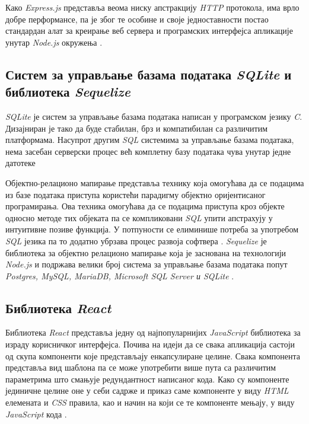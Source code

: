 \documentclass[12pt,oneside]{memoir}
\begin{document}
Како \textit{Express.js} представља веома ниску апстракцију \textit{HTTP} протокола, има врло добре перформансе, па је због те особине и своје једноставности постао стандардан алат за креирање веб сервера и програмских интерфејса апликације унутар \textit{Node.js }окружења \cite{mdnexpress}.

\subsection{Систем за управљање базама података \textit{SQLite} и библиотека \textit{Sequelize}}

\textit{SQLite} је систем за управљање базама података написан у програмском језику \textit{C}. Дизајниран је тако да буде стабилан, брз и компатибилан са различитим платформама.  Насупрот другим \textit{SQL} системима за управљање базама података, нема засебан серверски процес већ комплетну базу података чува унутар једне датотеке \cite{sqlite,sqlitetutorial}

Објектно-релационо мапирање представља технику која омогућава да се подацима из базе података приступа користећи парадигму објектно оријентисаног програмирања. Ова техника омогућава да се подацима приступа кроз објекте односно методе тих објеката па се компликовани \textit{SQL} упити апстрахују у интуитивне позиве функција. У потпуности се елиминише потреба за употребом \textit{SQL} језика па то додатно убрзава процес развоја софтвера \cite{orm}. \textit{Sequelize} је библиотека за објектно релационо мапирање која је заснована на технологији \textit{ Node.js} и подржава велики број система за управљање базама података попут \textit{Postgres, MySQL, MariaDB, Microsoft SQL Server и SQLite} \cite{sequelize}.

\subsection{Библиотека \textit{React}}
\label{section:react}
Библиотека \textit{React} представља једну од најпопуларнијих \textit{JavaScript} библиотека за израду корисничког интерфејса.  Почива на идеји да се свака апликација састоји од скупа компоненти које представљају енкапсулиране целине. Свака компонента представља вид шаблона па се може употребити више пута са различитим параметрима што смањује редундантност написаног кода. Како су компоненте јединичне целине оне у себи садрже и приказ саме компоненте у виду \textit{HTML} елемената и \textit{CSS} правила, као и начин на који се те компоненте мењају, у виду \textit{JavaScript} кода \cite{react}.
\end{document}

